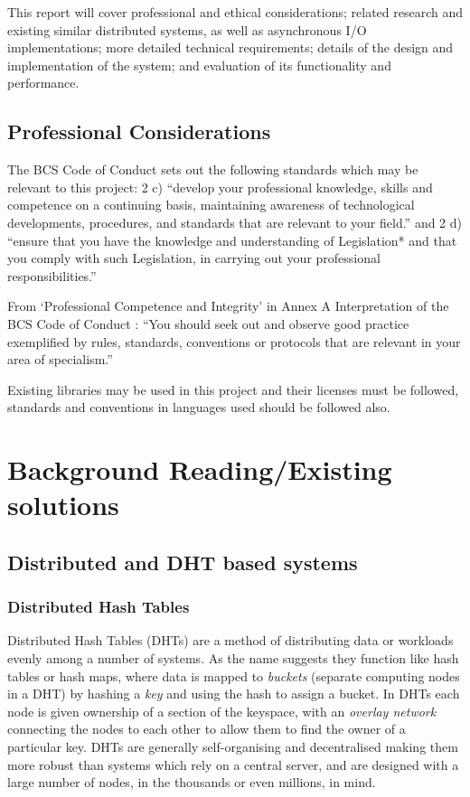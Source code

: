 \documentclass{article}
\begin{document}
This report will cover professional and ethical considerations; related research and existing similar distributed systems, as well as asynchronous I/O implementations; more detailed technical requirements; details of the design and implementation of the system; and evaluation of its functionality and performance.


\subsection{Professional Considerations}
The BCS Code of Conduct \cite{bcscoc} sets out the following standards which may be relevant to this project: 2 c) “develop your professional knowledge, skills and competence on a continuing basis, maintaining awareness of technological developments, procedures, and standards that are relevant to your field.” and 2 d) “ensure that you have the knowledge and understanding of Legislation* and that you comply with such Legislation, in carrying out your professional responsibilities.”

From ‘Professional Competence and Integrity’ in Annex A Interpretation of the BCS Code of Conduct \cite{bcscoca}: “You should seek out and observe good practice exemplified by rules, standards, conventions or protocols that are relevant in your area of specialism.”

Existing libraries may be used in this project and their licenses must be followed, standards and conventions in languages used should be followed also.



\section{Background Reading/Existing solutions}
\subsection{Distributed and DHT based systems}

\subsubsection{Distributed Hash Tables}
Distributed Hash Tables (DHTs) are a method of distributing data or workloads evenly among a number of systems. As the name suggests they function like hash tables or hash maps, where data is mapped to \textit{buckets} (separate computing nodes in a DHT) by hashing a \textit{key} and using the hash to assign a bucket. In DHTs each node is given ownership of a section of the keyspace, with an \textit{overlay network} connecting the nodes to each other to allow them to find the owner of a particular key.
DHTs are generally self-organising and decentralised making them more robust than systems which rely on a central server, and are designed with a large number of nodes, in the thousands or even millions, in mind.
\end{document}
